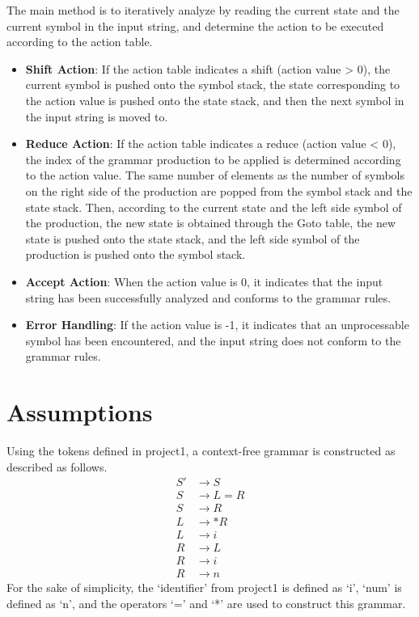 \documentclass[a4paper,12pt]{article}
\begin{document}
The main method is to iteratively analyze by reading the current state and the current symbol in the input string, and determine the action to be executed according to the action table.
\begin{itemize}
    \item \textbf{Shift Action}: If the action table indicates a shift (action value > 0), the current symbol is pushed onto the symbol stack, the state corresponding to the action value is pushed onto the state stack, and then the next symbol in the input string is moved to.
    \item \textbf{Reduce Action}: If the action table indicates a reduce (action value < 0), the index of the grammar production to be applied is determined according to the action value. The same number of elements as the number of symbols on the right side of the production are popped from the symbol stack and the state stack. Then, according to the current state and the left side symbol of the production, the new state is obtained through the Goto table, the new state is pushed onto the state stack, and the left side symbol of the production is pushed onto the symbol stack.
    \item \textbf{Accept Action}: When the action value is 0, it indicates that the input string has been successfully analyzed and conforms to the grammar rules.
    \item \textbf{Error Handling}: If the action value is -1, it indicates that an unprocessable symbol has been encountered, and the input string does not conform to the grammar rules.
\end{itemize}

\section{Assumptions}
Using the tokens defined in project1, a context-free grammar is constructed as described as follows.
\begin{align*}
    S' &\to S \\
    S &\to L = R \\
    S &\to R \\
    L &\to * R \\
    L &\to i \\
    R &\to L \\
    R &\to i \\
    R &\to n
    \end{align*}
For the sake of simplicity, the `identifier' from project1 is defined as `i', `num' is defined as `n', and the operators `=' and `*' are used to construct this grammar.
\end{document}
